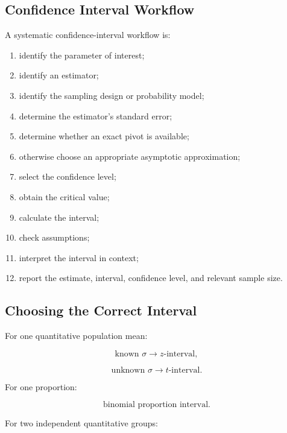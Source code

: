 \subsection{Confidence Interval Workflow}
\label{subsec:confidence-interval-workflow}

A systematic confidence-interval workflow is:

\begin{enumerate}
    \item identify the parameter of interest;
    \item identify an estimator;
    \item identify the sampling design or probability model;
    \item determine the estimator's standard error;
    \item determine whether an exact pivot is available;
    \item otherwise choose an appropriate asymptotic approximation;
    \item select the confidence level;
    \item obtain the critical value;
    \item calculate the interval;
    \item check assumptions;
    \item interpret the interval in context;
    \item report the estimate, interval, confidence level, and relevant
          sample size.
\end{enumerate}

\subsection{Choosing the Correct Interval}
\label{subsec:choosing-correct-ci}

For one quantitative population mean:

\[
\boxed{
\text{known }\sigma
\rightarrow
z\text{-interval},
}
\]

\[
\boxed{
\text{unknown }\sigma
\rightarrow
t\text{-interval}.
}
\]

For one proportion:

\[
\boxed{
\text{binomial proportion interval}.
}
\]

For two independent quantitative groups:

